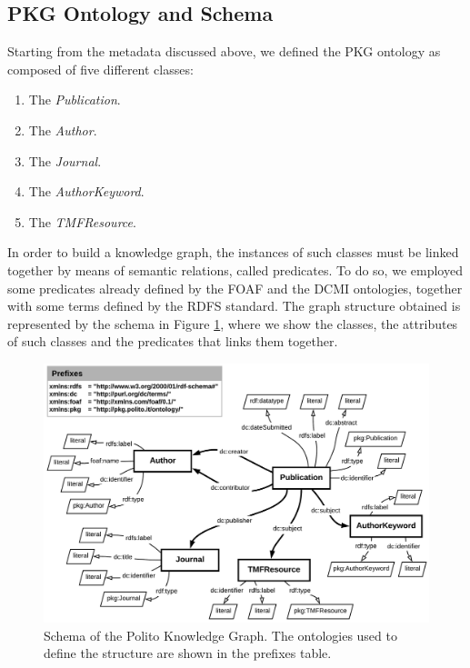 \documentclass[%
    corpo=13.5pt,
    twoside,
    oldstyle,
    tipotesi=magistrale,
    greek,
    evenboxes
]{toptesi}
\begin{document}
\subsection{PKG Ontology and Schema}

Starting from the metadata discussed above, we defined
the PKG ontology as composed of five different classes:

\begin{enumerate}
    \item The \emph{Publication}.
    \item The \emph{Author}.
    \item The \emph{Journal}.
    \item The \emph{AuthorKeyword}.
    \item The \emph{TMFResource}.
\end{enumerate}

In order to build a knowledge graph, the instances of such classes must be
linked together by means of semantic relations, called predicates.
To do so, we employed some predicates already defined by the
FOAF\cite{brickley2007} and the DCMI\cite{weibel1998} ontologies, together with
some terms defined by the RDFS\cite{lassila1998} standard.
The graph structure obtained is represented by the schema in
Figure \ref{fig:schema}, where we show the classes, the attributes of such
classes and the predicates that links them together.

\begin{figure}[h]
    \centering
    \includegraphics[scale=0.85]{img/schema.png}
    \caption{Schema of the Polito Knowledge Graph. The ontologies used to
    define the structure are shown in the prefixes table.}
    \label{fig:schema}
\end{figure}
\end{document}
